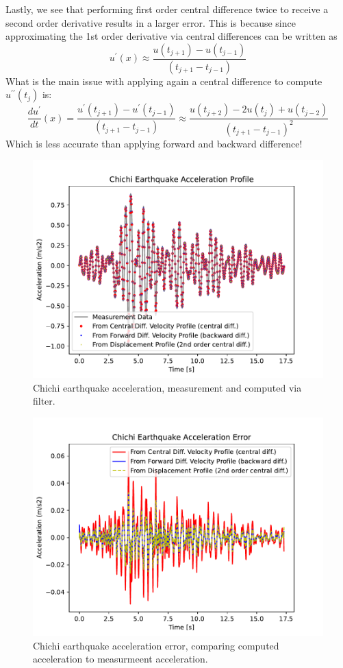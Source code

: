 Lastly, we see that performing first order central difference twice to receive a second order derivative 
results in a larger error. This is because since approximating the 1st order derivative via central differences can be written as
$$
u^{\prime}(x) \approx \frac{u(t_{j+1})-u(t_{j-1})}{(t_{j+1}-t_{j-1})}
$$
What is the main issue with applying again a central difference to compute $u^{\prime \prime}(t_j)$ is:
$$
\frac{d u^\prime}{dt}(x)=\frac{u^{\prime}(t_{j+1})-u^{\prime}(t_{j-1})}{(t_{j+1}-t_{j-1})} \approx \frac{u\left(t_{j+2}\right)-2 u\left(t_j\right)+u\left(t_{j-2}\right)}{(t_{j+1}-t_{j-1})^2}
$$
Which is less accurate than applying forward and backward difference!


\newpage

\begin{figure}
    \centering
    \includegraphics*[width=0.75\columnwidth]{chichi_acceleration.pdf}
    \caption{Chichi earthquake acceleration, measurement and computed via filter.}
    \label{chichi_acceleration}
\end{figure}

\begin{figure}
    \centering
    \includegraphics*[width=0.75\columnwidth]{chichi_acceleration_error.pdf}
    \caption{Chichi earthquake acceleration error, comparing computed acceleration to measurmeent acceleration.}
    \label{chichi_acceleration_error}
\end{figure}
\clearpage